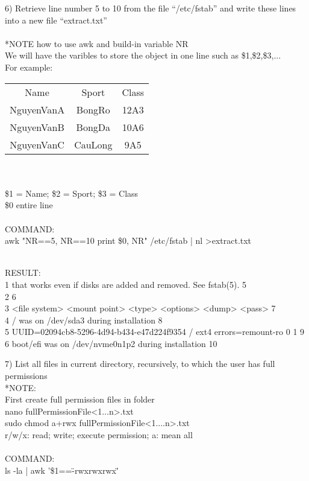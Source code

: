 \documentclass{article}
\begin{document}
\begin{tcolorbox}
6) Retrieve line number 5 to 10 from the file “/etc/fstab” and write these lines into a new file “extract.txt”
\\
\\*NOTE how to use awk and build-in variable NR
\\We will have the varibles to store the object in one line such as \$1,\$2,\$3,...
\\For example:
\\
\begin{tabular}{  c c c }
\\Name             &Sport          &Class    
\\NguyenVanA   &BongRo      &12A3
\\NguyenVanB   &BongDa      &10A6
\\NguyenVanC   &CauLong     &9A5
\end{tabular}
\\
\\ \$1 = Name; \$2 = Sport; \$3 = Class
\\ \$0 entire line
\\
\\COMMAND:
\\awk "NR==5, NR==10 {print \$0, NR}" /etc/fstab | nl  \textgreater extract.txt
\end{tcolorbox}

\begin{tcolorbox}
\\RESULT:
\\     1	that works even if disks are added and removed. See fstab(5). 5
\\     2	6
\\     3	<file system> <mount point>   <type>  <options>       <dump>  <pass> 7
\\     4	/ was on /dev/sda3 during installation 8
\\     5	UUID=02094cb8-5296-4d94-b434-e47d224f9354 /               ext4    errors=remount-ro 0       1 9
\\     6	boot/efi was on /dev/nvme0n1p2 during installation 10
\end{tcolorbox}

\begin{tcolorbox}
7) List all files in current directory, recursively, to which the user has full permissions
\\*NOTE:
\\First create full permission files in folder
\\nano fullPermissionFile<1...n>.txt
\\sudo chmod a+rwx fullPermissionFile<1....n>.txt
\\r/w/x: read; write; execute permission; a: mean all
\\
\\COMMAND:
\\ls -la | awk '\$1==\"-rwxrwxrwx\"'
\end{tcolorbox}
\end{document}
